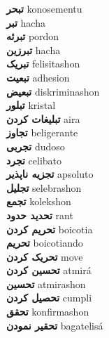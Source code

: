 \textbf{ تبحر  } konosementu \\
\textbf{ تبر  } hacha \\
\textbf{ تبرئه  } pordon \\
\textbf{ تبرزین  } hacha \\
\textbf{ تبریک  } felisitashon \\
\textbf{ تبعیت  } adhesion \\
\textbf{ تبعیض  } diskriminashon \\
\textbf{ تبلور  } kristal \\
\textbf{ تبلیغات کردن  } aira \\
\textbf{ تجاوز  } beligerante \\
\textbf{ تجربی  } dudoso \\
\textbf{ تجرد  } celibato \\
\textbf{ تجزیه ناپذیر  } apsoluto \\
\textbf{ تجلیل  } selebrashon \\
\textbf{ تجمع  } kolekshon \\
\textbf{ تحدید حدود  } rant \\
\textbf{ تحریم کردن  } boicotia \\
\textbf{ تحریم  } boicotiando \\
\textbf{ تحریک کردن  } move \\
\textbf{ تحسین کردن  } atmirá \\
\textbf{ تحسین  } atmirashon \\
\textbf{ تحصیل کردن  } cumpli \\
\textbf{ تحقق  } konfirmashon \\
\textbf{ تحقیر نمودن  } bagatelisá \\
